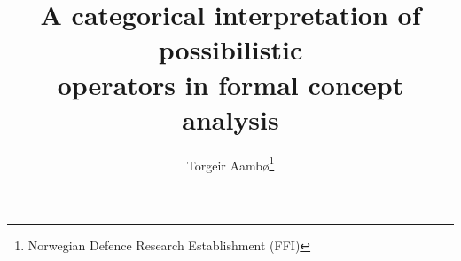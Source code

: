 \documentclass[11pt, twocolumn]{article}
\author{Torgeir Aamb\o \thanks{Norwegian Defence Research Establishment (FFI)}}
\title{A categorical interpretation of possibilistic \\ operators in formal concept analysis}
\date{}
\begin{document}
\maketitle 
 







\printbibliography{}  
\end{document}
